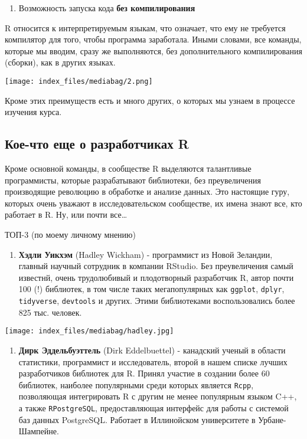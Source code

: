 \documentclass[
  letterpaper,
  DIV=11,
  numbers=noendperiod]{scrreprt}
\providecommand{\tightlist}{%
  \setlength{\itemsep}{0pt}\setlength{\parskip}{0pt}}\usepackage{longtable,booktabs,array}
\begin{document}
\begin{enumerate}
\def\labelenumi{\arabic{enumi}.}
\setcounter{enumi}{9}
\tightlist
\item
  Возможность запуска кода \textbf{без компилирования}
\end{enumerate}

R относится к интерпретируемым языкам, что означает, что ему не
требуется компилятор для того, чтобы программа заработала. Иными
словами, все команды, которые мы вводим, сразу же выполняются, без
дополнительного компилирования (сборки), как в других языках.

\texttt{[image: index\_files/mediabag/2.png]}

Кроме этих преимуществ есть и много других, о которых мы узнаем в
процессе изучения курса.

\hypertarget{ux43aux43eux435-ux447ux442ux43e-ux435ux449ux435-ux43e-ux440ux430ux437ux440ux430ux431ux43eux442ux447ux438ux43aux430ux445-r}{%
\subsection{Кое-что еще о разработчиках
R}\label{ux43aux43eux435-ux447ux442ux43e-ux435ux449ux435-ux43e-ux440ux430ux437ux440ux430ux431ux43eux442ux447ux438ux43aux430ux445-r}}

Кроме основной команды, в сообществе R выделяются талантливые
программисты, которые разрабатывают библиотеки, без преувеличения
производящие революцию в обработке и анализе данных. Это настоящие гуру,
которых очень уважают в исследовательском сообществе, их имена знают
все, кто работает в R. Ну, или почти все\ldots{}

ТОП-3 (по моему личному мнению)

\begin{enumerate}
\def\labelenumi{\arabic{enumi}.}
\tightlist
\item
  \textbf{Хэдли Уикхэм} (Hadley Wickham) - программист из Новой
  Зеландии, главный научный сотрудник в компании RStudio. Без
  преувеличения самый известнй, очень трудолюбивый и плодотворный
  разработчик R, автор почти 100 (!) библиотек, в том числе таких
  мегапопулярных как \texttt{ggplot}, \texttt{dplyr},
  \texttt{tidyverse}, \texttt{devtools} и других. Этими библиотеками
  воспользовались более 825 тыс. человек.
\end{enumerate}

\texttt{[image: index\_files/mediabag/hadley.jpg]}

\begin{enumerate}
\def\labelenumi{\arabic{enumi}.}
\setcounter{enumi}{1}
\tightlist
\item
  \textbf{Дирк Эддельбуэттель} (Dirk Eddelbuettel) - канадский ученый в
  области статистики, программист и исследователь, второй в нашем списке
  лучших разработчиков библиотек для R. Принял участие в создании более
  60 библиотек, наиболее популярными среди которых является
  \texttt{Rcpp}, позволяющая интегрировать R с другим не менее
  популярным языком C++, а также \texttt{RPostgreSQL}, предоставляющая
  интерфейс для работы с системой баз данных PostgreSQL. Работает в
  Иллинойском университете в Урбане-Шампейне.
\end{enumerate}
\end{document}
